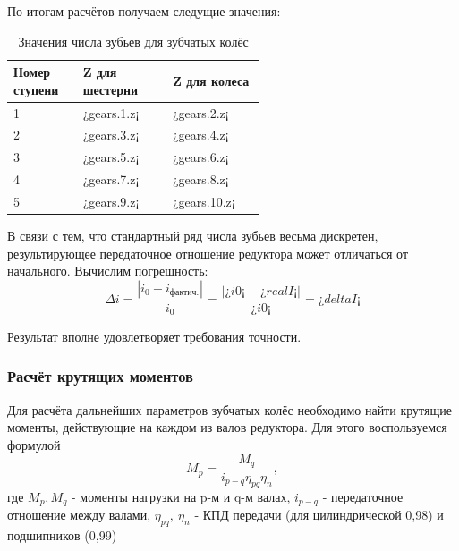 \documentclass[14pt,a4paper,russian]{scrartcl}
\begin{document}
        По итогам расчётов получаем следущие значения:
        \begin{table}[h!]
            \begin{center}
                \begin{tabular}{p{0.13\linewidth}p{0.23\linewidth}p{0.2\linewidth}}
                    \hline
                    Номер ступени & Z для шестерни & Z для колеса \\
                    \hline
                    1   &   ¿gears.1.z¡ & ¿gears.2.z¡ \\
                    2   &   ¿gears.3.z¡ & ¿gears.4.z¡ \\
                    3   &   ¿gears.5.z¡ & ¿gears.6.z¡ \\
                    4   &   ¿gears.7.z¡ & ¿gears.8.z¡ \\
                    5   &   ¿gears.9.z¡ & ¿gears.10.z¡ \\
                    \hline
                \end{tabular}
                \caption{Значения числа зубьев для зубчатых колёс}\label{tab:gears_z}
            \end{center}
        \end{table}
        
        В связи с тем, что стандартный ряд числа зубьев весьма дискретен, 
        результирующее передаточное отношение редуктора может отличаться от начального.
        Вычислим погрешность:
        \[ \Delta i = \frac{|i_0 - i_{\text{фактич.}}|}{i_0} =  
            \frac{|¿i0¡-¿realI¡|}{¿i0¡} = ¿deltaI¡\]
        
        Результат вполне удовлетворяет требования точности.
        
    \subsubsection{Расчёт крутящих моментов}
        Для расчёта дальнейших параметров зубчатых колёс необходимо найти крутящие моменты,
        действующие на каждом из валов редуктора. Для этого воспользуемся формулой
        \[ M_p = \frac{M_q}{i_{p-q}\eta_{pq}\eta_n}, \]
        где \( M_p, M_q \) - моменты нагрузки на p-м и q-м валах,
            \( i_{p-q} \) - передаточное отношение между валами,
            \( \eta_{pq},\ \eta_n \) - КПД передачи (для цилиндрической 0,98) и подшипников (0,99)\par
        
\end{document}
